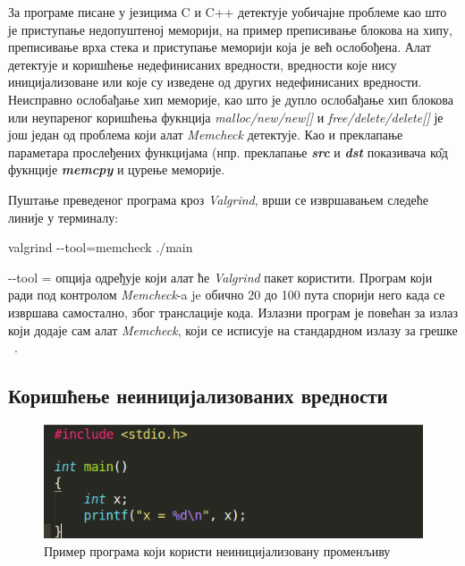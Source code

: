 \documentclass[12pt,oneside]{memoir}
\begin{document}
\indent За програме писане у језицима C и C++ детектује уобичајне проблеме као што је приступање недопуштеној меморији, на пример преписивање блокова на хипу, преписивање врха стека и приступање меморији која је већ ослобођена. Алат детектује и коришћење недефинисаних вредности, вредности које нису иницијализоване или које су изведене од других недефинисаних вредности. Неисправно ослобађање хип меморије, као што је дупло ослобађање хип блокова или неупареног коришћења фукнција \textit{malloc/new/new[]} и \textit{free/delete/delete[]} је још један од проблема који алат \textit{Memcheck} детектује. Као и преклапање параметара прослеђених функцијама (нпр. преклапање \textbf{\textit{src}} и \textbf{\textit{dst}} показивача к\^{о}д фукнције \textbf{\textit{memcpy}} и цурење меморије.

\indent Пуштање преведеног програма кроз \textit{Valgrind}, врши се извршавањем следеће линије у терминалу:

\begin{center}
 valgrind -\--tool=memcheck ./main
\end{center}

\indent -\--tool = опција одређује који алат ће \textit{Valgrind} пакет користити. Програм који ради под контролом \textit{Memcheck}-a je обично 20 до 100 пута спорији него када се извршава самостално, због транслације кода. Излазни програм је повећан за излаз који додаје сам алат \textit{Memcheck}, који се исписује на стандардном излазу за грешке ~\cite{memcheckRef}.



\subsection{Коришћење неиницијализованих вредности}

\begin{figure}[h!]
\begin{center}
\includegraphics[scale=0.75]{slika1.png}
\end{center}
\caption{Пример програма који користи неиницијализовану променљиву}
\label{fig:main}
\end{figure}
\end{document}
